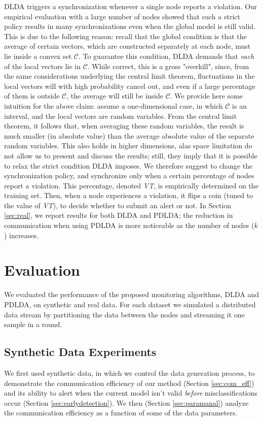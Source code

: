 \label{sec:PDLDA}
DLDA triggers a synchronization whenever a single node reports a violation.
Our empirical evaluation with a large number of nodes showed that such a strict
policy results in many synchronizations even when the global model is still 
valid. This is due to the following reason: 
recall that the global condition
is that the average of certain vectors,
which are constructed separately at each node, must lie inside a convex set $\mathcal{C}$.
To guarantee this condition, DLDA demands that {\em each} of the local vectors lie in
$\mathcal{C}$. While correct, this is a gross "overkill", since, from
the same considerations underlying the central limit theorem,
fluctuations in the local vectors will with high probability cancel out, and even if a large
percentage of them is outside $\mathcal{C}$, the average will still be inside
$\mathcal{C}$. We provide here some intuition for the above claim: assume a one-dimensional
case, in which $\mathcal{C}$ is an interval, and the local vectors are random
variables. From the central limit theorem, it follows that, when averaging these
random variables, the result is much smaller (in absolute value) than the
average absolute value of the separate random variables. This also holds 
in higher dimensions, alas space limitation do not allow us to present and discuss the results; still, they imply that it is possible to relax the strict
condition DLDA imposes. 
We therefore suggest to change the synchronization policy, and synchronize only when a certain 
percentage of nodes report a violation.
This percentage, denoted {\em VT}, is empirically determined on the training set. Then,
when a node experiences a violation, it flips a coin (tuned to the value of {\em VT}),
to decide whether to submit an alert or not. In Section \ref{sec:real}, we report
results for both DLDA and PDLDA; the reduction in communication when using
PDLDA is more noticeable as the number of nodes ($k$) increases.
%
%
%
\section{Evaluation}
%
We evaluated the performance of the proposed monitoring algorithms, DLDA and PDLDA, on synthetic and real data. For each dataset we simulated a distributed data stream by partitioning the data between the nodes and streaming it one sample in a round. 

\subsection{Synthetic Data Experiments}
We first used synthetic data, in which we control the data generation process, to
demonstrate the communication efficiency of our method (Section \ref{sec:com_eff})
and its ability to alert when the current model isn't valid \emph{before} 
misclassifications occur (Section \ref{sec:earlydetection}). We then (Section \ref{sec:paramanal}) analyze the communication efficiency  as a function of
some of the data parameters.
%
%
